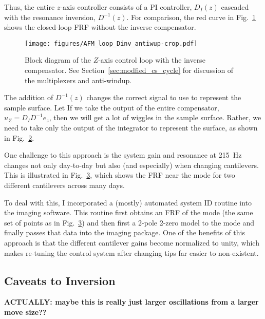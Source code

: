 \documentclass[11pt]{article}
\begin{document}
\begin{figure}[b!]
  \centering
  
  \caption{}
  \label{fig:z_control}
\end{figure}
Thus, the entire $z$-axis controller consists of a PI controller, $D_I(z)$ cascaded with the resonance inversion, $D^{-1}(z)$. For comparison, the red curve in Fig.~\ref{fig:z_control} shows the closed-loop FRF without the inverse compensator.
\begin{figure}
  \centering
  \texttt{[image: figures/AFM\_loop\_Dinv\_antiwup-crop.pdf]}
  \caption{Block diagram of the $Z$-axis control loop with the inverse compensator. See Section~\ref{sec:modfied_cs_cycle} for discussion of the multiplexers and anti-windup.}
  \label{fig:afm_bd_dinv}
\end{figure}
The addition of $D^{-1}(z)$ changes the correct signal to use to represent the sample surface. Let 
If we take the output of the entire compensator, $u_Z=D_ID^{-1}e_z$, then we will get a lot of wiggles in the sample surface. Rather, we need to take only the output of the integrator to represent the surface, as shown in Fig.~\ref{fig:afm_bd_dinv}.


One challenge to this approach is the system gain and resonance at 215~Hz changes not only day-to-day but also (and especially) when changing cantilevers. This is illustrated in Fig.~\ref{fig:z_evolution}, which shows the FRF near the mode for two different cantilevers across many days.

\begin{figure}
  \centering
  
  \caption{}
  \label{fig:z_evolution}
\end{figure}
To deal with this, I incorporated a (mostly) automated system ID routine into the imaging software. This routine first obtains an FRF of the mode (the same set of points as in Fig.~\ref{fig:z_evolution}) and then first a 2-pole 2-zero model to the mode and finally passes that data into the imaging package. One of the benefits of this approach is that the different cantilever gains become normalized to unity, which makes re-tuning the control system after changing tips far easier to non-existent.

\subsection{Caveats to Inversion}
\textbf{ACTUALLY: maybe this is really just larger oscillations from a larger move size??}
\end{document}
